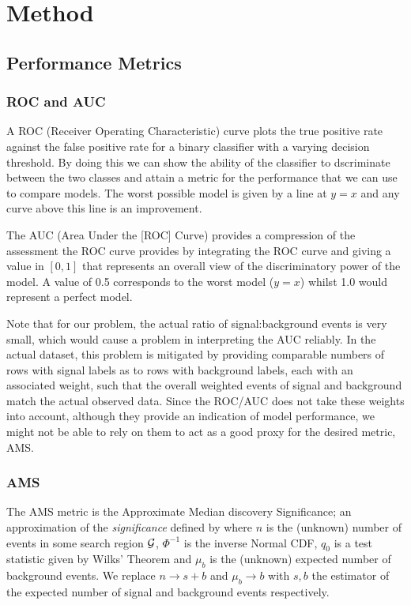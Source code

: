 \section{Method}
\label{method}

\subsection{Performance Metrics}

\subsubsection{ROC and AUC}
A ROC (Receiver Operating Characteristic) curve plots the true positive rate against the false positive rate for a binary classifier with a varying decision threshold. By doing this we can show the ability of the classifier to dscriminate between the two classes and attain a metric for the performance that we can use to compare models. The worst possible model is given by a line at $y=x$ and any curve above this line is an improvement. 

The AUC (Area Under the [ROC] Curve) provides a compression of the assessment the ROC curve provides by integrating the ROC curve and giving a value in $[0,1]$ that represents an overall view of the discriminatory power of the model. A value of 0.5 corresponds to the worst model ($y=x$) whilst 1.0 would represent a perfect model. 

Note that for our problem, the actual ratio of signal:background events is very small, which would cause a problem in interpreting the AUC reliably. In the actual dataset, this problem is mitigated by providing comparable numbers of rows with signal labels as to rows with background labels, each with an associated weight, such that the overall weighted events of signal and background match the actual observed data. Since the ROC/AUC does not take these weights into account, although they provide an indication of model performance, we might not be able to rely on them to act as a good proxy for the desired metric, AMS.

\subsubsection{AMS}
The AMS metric is the Approximate Median discovery Significance;  an approximation of the \emph{significance} defined by 
where $n$ is the (unknown) number of events in some search region $\mathcal{G}$, $\Phi^{-1}$ is the inverse Normal CDF, $q_0$ is a test statistic given by Wilks' Theorem and $\mu_b$ is the (unknown) expected number of background events. We replace $n\rightarrow s+b$ and $\mu_b\rightarrow b$ with $s,b$ the estimator of the expected number of signal and background events respectively.

